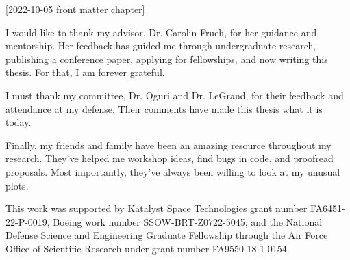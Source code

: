 [2022-10-05 front matter chapter]
%
%
%
%
%
%

%
%
%
\begin{statement}
\end{statement}




\begin{acknowledgments}
  I would like to thank my advisor, Dr. Carolin Frueh, for her guidance and mentorship. Her feedback has guided me through undergraduate research, publishing a conference paper, applying for fellowships, and now writing this thesis. For that, I am forever grateful.

  I must thank my committee, Dr. Oguri and Dr. LeGrand, for their feedback and attendance at my defense. Their comments have made this thesis what it is today.

  Finally,  my friends and family have been an amazing resource throughout my research. They've helped me workshop ideas, find bugs in code, and proofread proposals. Most importantly, they've always been willing to look at my unusual plots.

  This work was supported by Katalyst Space Technologies grant number FA6451-22-P-0019, Boeing work number SSOW-BRT-Z0722-5045, and the National Defense Science and Engineering Graduate Fellowship through the Air Force Office of Scientific Research under grant number FA9550-18-1-0154.
\end{acknowledgments}


